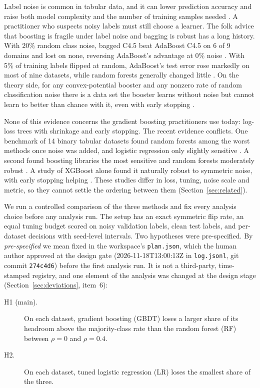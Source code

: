 \documentclass[11pt]{article}
\begin{document}
Label noise is common in tabular data, and it can lower prediction accuracy and raise both
model complexity and the number of training samples needed \citep{frenay2014}. A
practitioner who suspects noisy labels must still choose a learner. The folk advice that
boosting is fragile under label noise and bagging is robust has a long history. With 20\%
random class noise, bagged C4.5 beat AdaBoost C4.5 on 6 of 9 domains and lost on none,
reversing AdaBoost's advantage at 0\% noise \citep{dietterich2000}. With 5\% of training
labels flipped at random, AdaBoost's test error rose markedly on most of nine datasets,
while random forests generally changed little \citep{breiman2001}. On the theory side, for
any convex-potential booster and any nonzero rate of random classification noise there is a
data set the booster learns without noise but cannot learn to better than chance with it,
even with early stopping \citep{long2010}.

None of this evidence concerns the gradient boosting practitioners use today: log-loss
trees with shrinkage and early stopping. The recent evidence conflicts. One benchmark of 14
binary tabular datasets found random forests among the worst methods once noise was added,
and logistic regression only slightly sensitive \citep{lebaher2020}. A second found boosting
libraries the most sensitive and random forests moderately robust \citep{nawaz2025}. A study
of XGBoost alone found it naturally robust to symmetric noise, with early stopping helping
\citep{eisenburger2024}. These studies differ in loss, tuning, noise scale and metric, so
they cannot settle the ordering between them (Section~\ref{sec:related}).

We run a controlled comparison of the three methods and fix every analysis choice before
any analysis run. The setup has an exact symmetric flip rate, an equal tuning budget scored on
noisy validation labels, clean test labels, and per-dataset decisions with seed-level
intervals. Two hypotheses were pre-specified. By \emph{pre-specified} we mean fixed in the
workspace's \texttt{plan.json}, which the human author approved at the design gate
(2026-11-18T13:00:13Z in \texttt{log.jsonl}, git commit \texttt{274c4d6}) before the first
analysis run. It is not a third-party, time-stamped registry, and one element of the
analysis was changed at the design stage (Section~\ref{sec:deviations}, item~6):
\begin{description}
  \item[H1 (main).] On each dataset, gradient boosting (GBDT) loses a larger share of its
  headroom above the majority-class rate than the random forest (RF) between $\rho=0$ and
  $\rho=0.4$.
  \item[H2.] On each dataset, tuned logistic regression (LR) loses the smallest share of
  the three.
\end{description}
\end{document}
